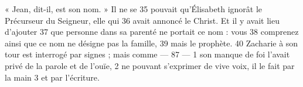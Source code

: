 « Jean, dit-il, est son nom. »
Il ne se	 
35	 	pouvait qu'Élisabeth ignorât le Précurseur du Seigneur, elle qui	 
36	 	avait annoncé le Christ.
Et il y avait lieu d'ajouter	 
37	 	que personne dans sa parenté ne portait ce nom : vous	 
38	 	comprenez ainsi que ce nom ne désigne pas la famille,	 
39	 	mais le prophète.	 
40	 	Zacharie à son tour est interrogé par signes ; mais comme	 
 	--- 87 ---	 
1	 	son manque de foi l'avait privé de la parole et de l'ouïe,	 
2	 	ne pouvant s'exprimer de vive voix, il le fait par la main	 
3	 	et par l'écriture.
